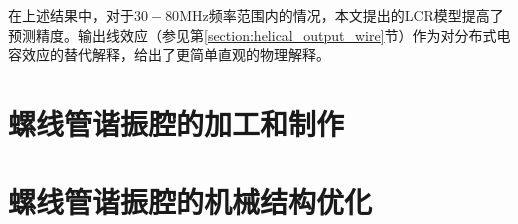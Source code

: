 在上述结果中，对于$30-80$MHz频率范围内的情况，本文提出的LCR模型提高了预测精度。输出线效应（参见第\ref{section:helical_output_wire}节）作为对分布式电容效应的替代解释，给出了更简单直观的物理解释。

\section[螺线管谐振腔的加工和制作]{螺线管谐振腔的加工和制作}

\section[螺线管谐振腔的机械结构优化]{螺线管谐振腔的机械结构优化}

